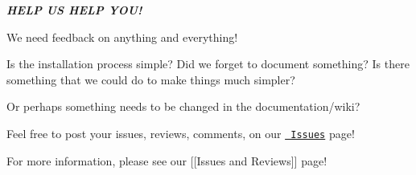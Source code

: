 {\itshape {\bfseries{H\+E\+LP US H\+E\+LP Y\+O\+U!}}}

We need feedback on anything and everything!

Is the installation process simple? Did we forget to document something? Is there something that we could do to make things much simpler?

Or perhaps something needs to be changed in the documentation/wiki?

Feel free to post your issues, reviews, comments, on our \href{https://github.com/Calvin-CS/TSGL/issues}{\texttt{ Issues}} page!

For more information, please see our \mbox{[}\mbox{[}Issues and Reviews\mbox{]}\mbox{]} page! 